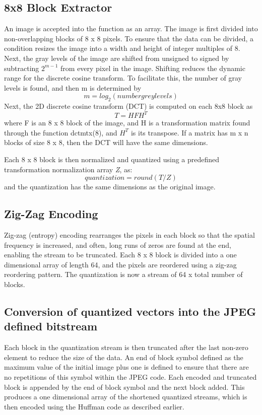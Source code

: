 \documentclass[11pt,a4paper,table]{article}
\begin{document}
\subsection{8x8 Block Extractor}
An image is accepted into the function as an array. The image is first divided into non-overlapping blocks of 8 x 8 pixels. To ensure that the data can be divided, a condition resizes the image into a width and height of integer multiples of 8. Next, the gray levels of the image are shifted from unsigned to signed by subtracting \(2^{m-1}\) from every pixel in the image. Shifting reduces the dynamic range for the discrete cosine transform. To facilitate this, the number of gray levels is found, and then m is determined by 
\begin{equation}
m = log_2(number grey levels)
\end{equation}
Next, the 2D discrete cosine transform (DCT) is computed on each 8x8 block as
\begin{equation}
T = HFH^T
\end{equation}
where F is an 8 x 8 block of the image, and H is a transformation matrix found through the function dctmtx(8), and \(H^T\) is its transpose. If a matrix has m x n blocks of size 8 x 8, then the DCT will have the same dimensions.

Each 8 x 8 block is then normalized and quantized using a predefined transformation normalization array \textit{Z}, as:
\begin{equation}
quantization= round(T/Z)
\end{equation}
and the quantization has the same dimensions as the original image. 

\subsection{Zig-Zag Encoding}
Zig-zag (entropy) encoding rearranges the pixels in each block so that the spatial frequency is increased, and often, long runs of zeros are found at the end, enabling the stream to be truncated. Each 8 x 8 block is divided into a one dimensional array of length 64, and the pixels are reordered using a zig-zag reordering pattern. The quantization is now a stream of 64 x total number of blocks.

\subsection{Conversion of quantized vectors into the JPEG defined bitstream}
Each block in the quantization stream is then truncated after the last non-zero element to reduce the size of the data. An end of block symbol defined as the maximum value of the initial image plus one is defined to ensure that there are no repetitions of this symbol within the JPEG code. Each encoded and truncated block is appended by the end of block symbol and the next block added. This produces a one dimensional array of the shortened quantized streams, which is then encoded using the Huffman code as described earlier.

\pagebreak



\pagebreak
\end{document}

